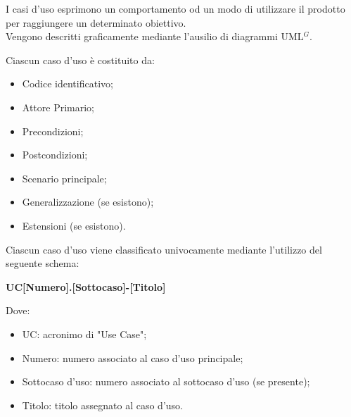 

    I casi d’uso esprimono un comportamento od un modo di utilizzare il prodotto per raggiungere un determinato obiettivo. \\
    Vengono descritti graficamente mediante l’ausilio di diagrammi UML$^{G}$. 

    Ciascun caso d’uso è costituito da:
    \begin{itemize}
        \item Codice identificativo;
        \item Attore Primario;
        \item Precondizioni;
        \item Postcondizioni;
        \item Scenario principale;
        \item Generalizzazione (se esistono);
        \item Estensioni (se esistono).
        
    \end{itemize}


    Ciascun caso d’uso viene classificato univocamente mediante l’utilizzo del seguente schema:

        \begin{center}
            \large{\textbf{UC[Numero].[Sottocaso]-[Titolo]}}
        \end{center}
    Dove:
    \begin{itemize}
        \item UC: acronimo di "Use Case";
        \item Numero: numero associato al caso d'uso principale;
        \item Sottocaso d'uso: numero associato al sottocaso d'uso (se presente);
        \item Titolo: titolo assegnato al caso d'uso.
    \end{itemize}
    

 